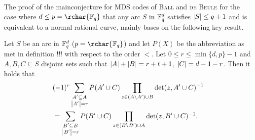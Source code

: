 \documentclass[a4paper]{article}
\begin{document}
The proof of the mainconjecture for MDS codes of \textsc{Ball} and \textsc{de Beule} for the case where
$d\leq p=\rchar{\field{q}}$ that any arc $S$ in $\mathbb{F}_{q}^d$ satisfies $\left|S\right|\leq q+1$ and is equivalent to a normal rational
curve, mainly bases on the following key result.

\begin{lemma}
  Let $S$ be an arc in $\mathbb{F}_{q}^d$ ($p=\rchar{\field{q}}$) and let
  $P(X)$ be the abbreviation as met in definition !!! with respect to the order $<$. Let $0\leq
  r\leq\min\{d,p\}-1$ and $A,B,C\subseteq S$ disjoint sets such
  that $\left|A\right|+\left|B\right|=r+t+1$, $\left|C\right|=d-1-r$. Then it holds that
  \begin{align*}
    &(-1)^r\sum_{\substack{A'\subseteq A\\ \left|A'\right|=r}}{P(A'\cup C)\prod_{z\in (A\setminus A')\cup B}{\det(z,A'\cup C)^{-1}}}\\
    &= \sum_{\substack{B'\subseteq B\\ \left|B'\right|=r}}{P(B'\cup C)\prod_{z\in (B\setminus B')\cup A}{\det(z,B'\cup C)^{-1}}}\text{.}
  \end{align*}
\end{lemma}
\end{document}
